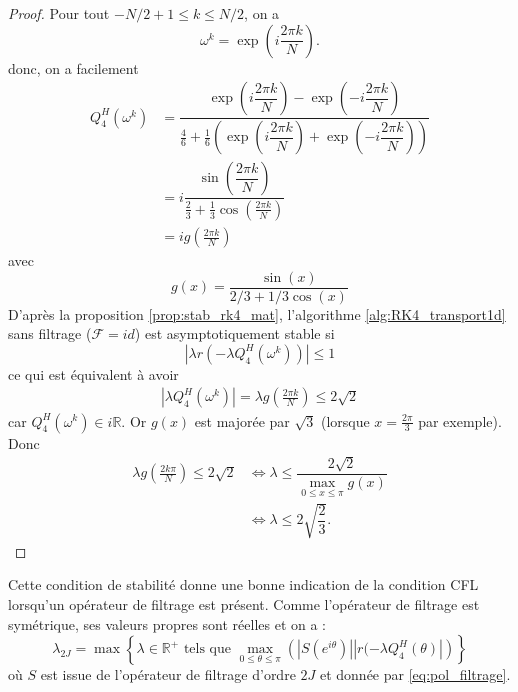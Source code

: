 \begin{proof}
Pour tout $-N/2 + 1 \leq k \leq N/2$, on a
\begin{equation}
\omega^k = \exp \left( i \dfrac{2 \pi k}{N} \right).
\end{equation}
donc, on a facilement
\begin{align*}
Q_4^H(\omega^k) & = \dfrac{\exp \left( i \dfrac{2 \pi k}{N} \right) - \exp \left(- i \dfrac{2 \pi k}{N} \right)}{\frac{4}{6} + \frac{1}{6} \left( \exp \left( i \dfrac{2 \pi k}{N} \right) + \exp \left( -i \dfrac{2 \pi k}{N} \right) \right)} \\
		& = i \dfrac{\sin \left( \dfrac{2 \pi k}{N} \right)}{\frac{2}{3} + \frac{1}{3} \cos \left( \frac{2 \pi k}{N} \right)}\\
		& = i g \left( \frac{2 \pi k}{N} \right)
\end{align*}
avec 
\begin{equation}
g(x) = \dfrac{\sin(x)}{2/3 + 1/3 \cos (x)}
\end{equation}
D'après la proposition \ref{prop:stab_rk4_mat}, l'algorithme \ref{alg:RK4_transport1d} sans filtrage ($\mathcal{F} = id$) est asymptotiquement stable si
\begin{equation}
|\lambda r(- \lambda Q_4^H(\omega^k))| \leq 1
\end{equation}
ce qui est équivalent à avoir
\begin{align}
|\lambda Q_4^H(\omega^k)| = \lambda g \left( \frac{2\pi k}{N} \right) \leq 2 \sqrt{2}
\end{align}
car $Q_4^H(\omega^k) \in i \mathbb{R}$.
Or $g(x)$ est majorée par $\sqrt{3}$ (lorsque $x=\frac{2 \pi}{3}$ par exemple).
Donc 
\begin{align*}
\lambda g \left( \frac{2 k \pi}{N} \right) \leq 2 \sqrt{2} & \Leftrightarrow \lambda \leq \dfrac{2 \sqrt{2}}{\max_{0 \leq x \leq \pi} g(x)} \\
	& \Leftrightarrow \lambda \leq 2 \sqrt{\dfrac{2}{3}}. 
\end{align*}
\end{proof}

Cette condition de stabilité donne une bonne indication de la condition CFL lorsqu'un opérateur de filtrage est présent. Comme l'opérateur de filtrage est symétrique, ses valeurs propres sont réelles et on a :
\begin{equation}
\lambda_{2J} = \max \left\lbrace \lambda \in \mathbb{R}^+ \text{ tels que } \max_{0 \leq \theta \leq \pi} \left(|S(e^{i \theta})| | r(-\lambda Q_4^H(\theta) | \right) \right\rbrace
\end{equation}
où $S$ est issue de l'opérateur de filtrage d'ordre $2J$ et donnée par \eqref{eq:pol_filtrage}.


